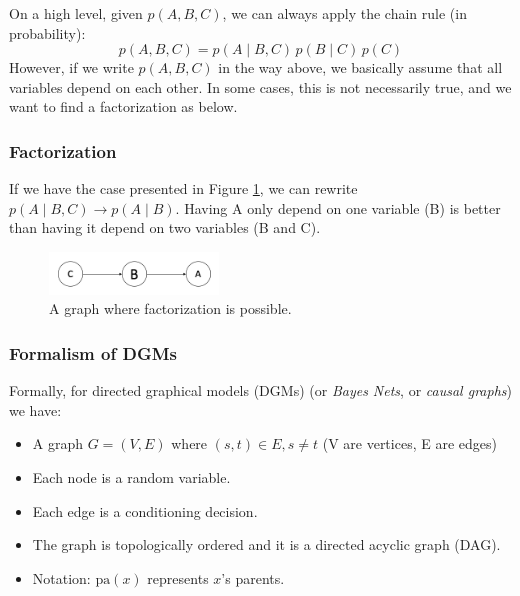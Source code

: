 \documentclass{article}
\begin{document}
On a high level,
given $p(A, B, C)$, we can always apply the chain rule (in probability):
\[ 
p(A, B, C) = p(A \mid B, C) \, p(B \mid C) \, p(C) 
\]
However, if we write $p(A, B, C)$ in the way above, we basically assume that all variables depend on each other. In some cases, this is not necessarily true, and we want to find a factorization as below. 

\subsubsection{Factorization}
If we have the case presented in Figure \ref{fig:nb2}, we can rewrite $p(A \mid B, C) \rightarrow p(A \mid B)$.
Having A only depend on one variable (B) is better than having it depend on two variables (B and C).
\begin{figure}[!ht]
    \centering
    \includegraphics[width = 0.4\textwidth]{nb2.png}
    \caption{A graph where factorization is possible.}
    \label{fig:nb2}
\end{figure}


\subsubsection{Formalism of DGMs}
\noindent
Formally, for directed graphical models (DGMs) (or \emph{Bayes Nets}, or \emph{causal graphs}) we have:
\begin{itemize}
\item A graph $G=(V, E)$ where $(s, t) \in E, s \neq t$ (V are vertices, E are edges)
\item Each node is a random variable.
\item Each edge is a conditioning decision.
\item The graph is topologically ordered and it is a directed acyclic graph (DAG).
\item Notation: $\mathrm{pa}(x)$ represents $x$'s parents.
\end{itemize}
\end{document}
